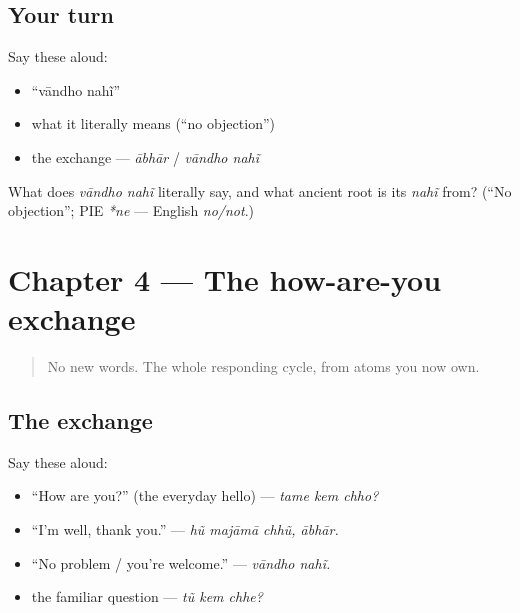 \subsection*{Your turn}
Say these aloud:

\begin{itemize}
\raggedright
  \item \textquotedblleft{}vāndho nahĩ\textquotedblright{}
  \item what it literally means (\textquotedblleft{}no objection\textquotedblright{})
  \item the exchange — \emph{ābhār} / \emph{vāndho nahĩ}
\end{itemize}

\begin{tcolorbox}[breakable,colback=teal!4,colframe=teal!35!black,title={Before you move on}]
What does \emph{vāndho nahĩ} literally say, and what ancient root is its \emph{nahĩ} from? (\textquotedblleft{}No objection\textquotedblright{}; PIE \emph{*ne} — English \emph{no/not}.)
\end{tcolorbox}
\section[Practice]{Chapter 4 — The how-are-you exchange}

\label{lesson:GU-C03-practice}



\begin{quote}
No new words. The whole responding cycle, from atoms you now own.
\end{quote}

\subsection*{The exchange}
Say these aloud:

\begin{itemize}
\raggedright
  \item \textquotedblleft{}How are you?\textquotedblright{} (the everyday hello) — \emph{tame kem chho?}
  \item \textquotedblleft{}I'm well, thank you.\textquotedblright{} — \emph{hũ majāmā chhũ, ābhār.}
  \item \textquotedblleft{}No problem / you're welcome.\textquotedblright{} — \emph{vāndho nahĩ.}
  \item the familiar question — \emph{tũ kem chhe?}
\end{itemize}

